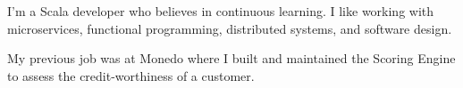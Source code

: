 

\begin{cvparagraph}

I'm a Scala developer who believes in continuous learning. I like working with microservices, functional programming, distributed systems, and software design.

My previous job was at Monedo where I built and maintained the Scoring Engine to assess the credit-worthiness of a customer.
\end{cvparagraph}
